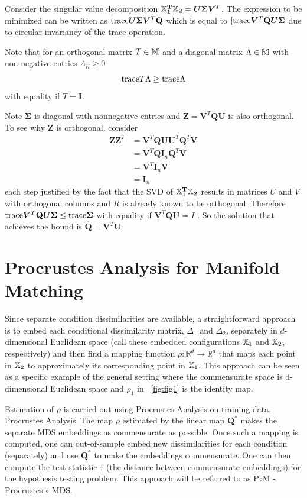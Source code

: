 \documentclass[12pt,oneside,final]{thesis}\usepackage[]{graphicx}\usepackage[]{color}
\begin{document}
 Consider the singular value decomposition $\mathbf{{\mathbb{X}}_1^T {\mathbb{X}}_2}=\bm{U} \bm{\Sigma} \bm{V}^T$. The expression to be minimized can be written as $\textup{trace} {\bm{U} \bm{\Sigma} \bm{V}^T \mathbf{Q}}$ which is equal to  $[\textup{trace} { \bm{V}^T \mathbf{Q} \bm{U} \bm{\Sigma}} $ due to circular invariancy of the trace operation.
 
 Note that for an orthogonal matrix $T\in \mathbb{M}$ and a diagonal matrix $\Lambda \in \mathbb{M}$ with non-negative entries $\Lambda_{ii}\geq 0$
 \[
 \textup{trace}{ T \Lambda } \geq \textup{trace}{ \Lambda} \] with equality if $T=\bm{I}$.
 
 Note $\bm{\Sigma}$ is diagonal with nonnegative entries  and $\bm{Z}=\bm{V}^T \mathbf{Q} \bm{U}$ is also orthogonal. To see why $\bm{Z}$ is orthogonal, consider 
 \begin{align*}
 \bm{Z}\bm{Z}^T &= \bm{V}^T \mathbf{Q} \bm{U} \bm{U}^T \mathbf{Q}^T  \bm{V} \\
 &= \bm{V}^T \mathbf{Q} \bm{I}_n \mathbf{Q}^T  \bm{V}\\
 &= \bm{V}^T \bm{I}_n  \bm{V} \\
 &= \bm{I}_n
 \end{align*} 
 each step justified by the fact that the SVD of $\mathbf{{\mathbb{X}}_1^T {\mathbb{X}}_2}$ results in matrices  $U$ and $V$ with orthogonal columns and $R$ is already known to be orthogonal.
 Therefore  $\textup{trace} { \bm{V}^T \mathbf{Q} \bm{U} \bm{\Sigma}}  \leq \textup{trace} \bm{\Sigma}$ 
with equality if  $\bm{V}^T \mathbf{Q} \bm{U} = I$ . So the solution  that achieves the bound is $\hat{\mathbf{Q}}= \bm{V}^T  \bm{U}$

\section{Procrustes Analysis for Manifold Matching}

Since separate  condition dissimilarities are available, a straightforward approach is to embed each conditional dissimilarity matrix, $\Delta_1$ and $\Delta_2$, separately  in  $d$-dimensional Euclidean space (call these embedded configurations ${\mathbb{X}}_1$ and ${\mathbb{X}}_2$, respectively) and then find a mapping function $\rho :\mathbb{R}^{d}\rightarrow\mathbb{R}^{d}$ that maps each point in ${\mathbb{X}}_2$ to approximately its corresponding point in ${\mathbb{X}}_1$. This approach can be seen as a specific example of the general setting where the commensurate space is d-dimensional  Euclidean space and $\rho_1$ in  ~\ref{fig:fig1} is the identity map. 

Estimation of $\rho$ is carried out using  Procrustes Analysis  on training data. Procrustes Analysis~The map $\rho$ estimated by the linear map $\mathbf{Q}^*$   makes the separate MDS embeddings as commensurate as possible. Once such a mapping is computed, one can out-of-sample embed  new dissimilarities for each condition (separately)  and  use $\mathbf{Q}^*$ to make the embeddings commensurate.
One can then compute the test statistic $\tau$ (the distance between commensurate embeddings) for  the hypothesis testing problem. This approach will be referred to  as P$\circ$M - Procrustes $\circ$ MDS.
\end{document}
